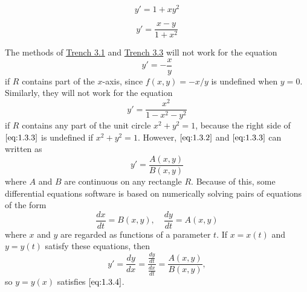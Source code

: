 \documentclass{ximera}
\begin{document}
\begin{example}\label{ex:fig010303}
$$
y'=1+xy^2
$$

\begin{center}  
\end{center}

\end{example}
\begin{example}\label{ex:fig010304}
$$
y'=\frac{x-y}{1+x^2}
$$

\begin{center}  
\end{center}

\end{example}
The methods of \href{https://xerxes.ximera.org/differentialequations/main/eulersMethod/eulersMethod}{Trench 3.1} and \href{https://xerxes.ximera.org/differentialequations/main/rungeKutta/rungeKutta}{Trench 3.3} will not work for the equation
\begin{equation} \label{eq:1.3.2}
y'=-\frac{x}{y}
\end{equation}
if $R$ contains part of the $x$-axis, since $f(x,y)=-x/y$ is undefined
when $y=0$. Similarly, they will not work for the equation
\begin{equation} \label{eq:1.3.3}
y'=\frac{x^2}{1-x^2-y^2}
\end{equation}
if $R$ contains any part of the unit circle $x^2+y^2=1$, because the
right side of $\eqref{eq:1.3.3}$ is undefined if $x^2+y^2=1$. However,
$\eqref{eq:1.3.2}$ and $\eqref{eq:1.3.3}$ can written as
\begin{equation} \label{eq:1.3.4}
y'=\frac{A(x,y)}{B(x,y)}
\end{equation}
where $A$ and $B$ are continuous on any rectangle $R$. Because of
this, some differential equations software is based on
numerically solving pairs of equations of the form
\begin{equation} \label{eq:1.3.5}
\frac{dx}{dt}=B(x,y),\quad \frac{dy}{dt}=A(x,y)
\end{equation}
where $x$ and $y$ are regarded as functions of a parameter $t$.
If $x=x(t)$ and $y=y(t)$  satisfy these equations, then
$$
y'=\frac{dy}{dx}=\frac{\frac{dy}{dt}}{\frac{dx}{dt}}=\frac{A(x,y)}{B(x,y)},
$$
so $y=y(x)$ satisfies $\eqref{eq:1.3.4}$.
 
\end{document}
